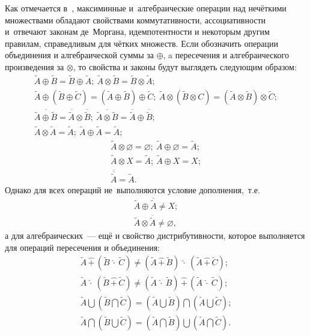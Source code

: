 Как отмечается в~\cite{Rutkovskaya, Kaufmann, Lipetsk}, максиминные и~алгебраические операции над нечёткими множествами обладают свойствами коммутативности, ассоциативности и~отвечают законам де~Моргана, идемпотентности и некоторым другим правилам, справедливым для чётких множеств. Если обозначить операции объединения и алгебраической суммы за $\oplus$, a пересечения и алгебраического произведения за $\otimes$, то свойства и законы будут выглядеть следующим образом:
\begin{gather*}
	\tilde A \oplus \tilde B = \tilde B \oplus \tilde A;\ \tilde A \otimes \tilde B = \tilde B \otimes \tilde A; \allowbreak \\
	\tilde A \oplus \left(\tilde B \oplus \tilde C \right) = \left( \tilde A \oplus \tilde B \right) \oplus \tilde C;\ \tilde A \otimes \left(\tilde B \otimes C \right) = \left( \tilde A \otimes \tilde B \right) \otimes \tilde C; \allowbreak \\
	\overline{\tilde A \oplus \tilde B}=\overline{\tilde A} \otimes \overline{\tilde B};\  \overline{\tilde A \otimes \tilde B}=\overline{\tilde A} \oplus \overline{\tilde B}; \allowbreak \\
	\tilde A \otimes \tilde A = \tilde A;\ \tilde A \oplus \tilde A = \tilde A;
\end{gather*}
\begin{gather*}
	\tilde A \otimes \varnothing = \varnothing;\ \tilde A \oplus \varnothing = \tilde A; \allowbreak \\
	\tilde A \otimes X = \tilde A;\ \tilde A \oplus X = X; \\
	\overline{\overline{\tilde A}} = \tilde A.
\end{gather*}
Однако для всех операций не~выполняются условие дополнения,~т.е.
\begin{gather*}
	\tilde{A} \oplus \overline{\tilde{A}}\ne X; \\
	\tilde{A} \otimes \overline{\tilde{A}}\ne \varnothing,
\end{gather*}
а для алгебраических~--- ещё и свойство дистрибутивности, которое выполняется для операций пересечения и объединения:
\begin{gather*}
	\tilde{A}\, \widehat{+}\, \left( \tilde{B}\ \widehat{\cdot}\ \tilde C \right) \neq \left( \tilde A\, \widehat{+}\, \tilde B \right)\ \widehat{\cdot}\ \left(\tilde A\, \widehat{+}\, \tilde C \right); \\
		\tilde{A}\ \widehat{\cdot}\ \left( \tilde{B}\, \widehat{+}\, \tilde C \right) \neq \left( \tilde A\ \widehat{\cdot}\ \tilde B \right)\, \widehat{+}\, \left(\tilde A\ \widehat{\cdot}\ \tilde C \right); \\
	\tilde A \bigcup \left( \tilde B \bigcap \tilde C \right) = \left(\tilde A \bigcup \tilde B \right) \bigcap \left(\tilde A \bigcup \tilde C \right); \\
	\tilde A \bigcap \left( \tilde B \bigcup \tilde C \right) = \left(\tilde A \bigcap \tilde B \right) \bigcup \left(\tilde A \bigcap \tilde C \right).
\end{gather*}

